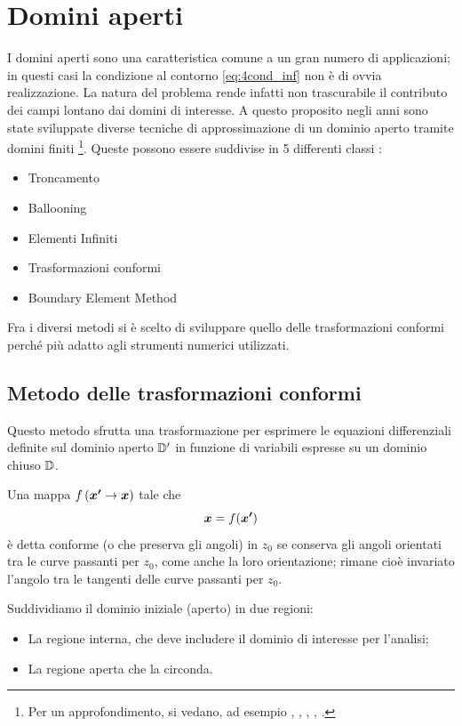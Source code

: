 \section{Domini aperti}
\label{sec:dominiaperti}
I domini aperti sono una caratteristica comune a un gran numero di applicazioni; in questi casi la condizione al contorno \eqref{eq:4cond_inf} non è di ovvia realizzazione. La natura del problema rende infatti non trascurabile il contributo dei campi lontano dai domini di interesse.
A questo proposito negli anni sono state sviluppate diverse tecniche di approssimazione di un dominio aperto tramite domini finiti 
\footnote{Per un approfondimento, si vedano, ad esempio \citep{emson_methods_1988}, \citep{imhoff_original_1990}, \citep{brunotte_finite_1992}, \citep{el_ouazzani_finite_1996}, \citep{abert_numerical_2013}.}.
Queste possono essere suddivise in 5 differenti classi \citep{emson_methods_1988}:
\begin{itemize}
\item Troncamento 
\item Ballooning
\item Elementi Infiniti 
\item Trasformazioni conformi 
\item Boundary Element Method 
\end{itemize}
Fra i diversi metodi si è scelto di sviluppare quello delle trasformazioni conformi perché più adatto agli strumenti numerici utilizzati.

\subsection{Metodo delle trasformazioni conformi}
Questo metodo sfrutta una trasformazione per esprimere le equazioni differenziali definite sul dominio aperto $\mathbb{D'}$ in funzione di variabili espresse su un dominio chiuso $\mathbb{D}$. 

Una mappa $f\left(\boldsymbol{x'}\rightarrow\boldsymbol{x}\right)$ tale che
\begin{equation}
\label{eq:4map}
\boldsymbol{x} = f(\boldsymbol{x'})
\end{equation}
è detta conforme (o che preserva gli angoli) in $z_0$ se conserva gli angoli orientati tra le curve passanti per $z_0$, come anche la loro orientazione; rimane cioè invariato l'angolo tra le tangenti delle curve passanti per $z_0$.


Suddividiamo il dominio iniziale (aperto) in due regioni:
\begin{itemize}
\item La regione interna, che deve includere il dominio di interesse per l'analisi;
\item La regione aperta che la circonda.
\end{itemize}

